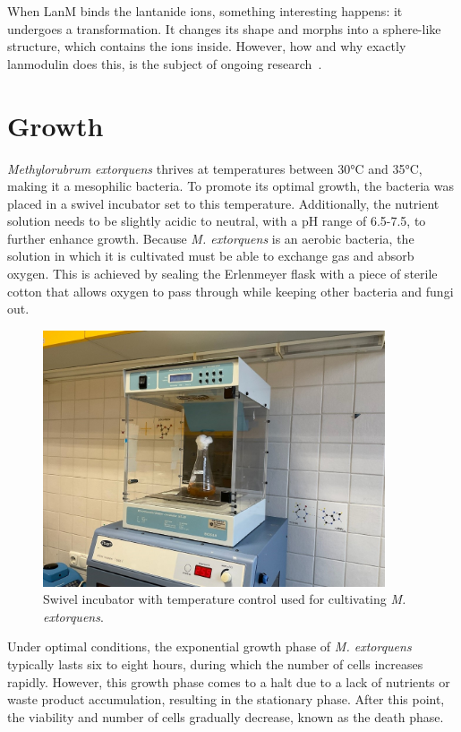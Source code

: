 When LanM binds the lantanide ions, something interesting happens: it undergoes a transformation.
It changes its shape and morphs into a sphere-like structure, which contains the ions inside.
However, how and why exactly lanmodulin does this, is the subject of ongoing research~\cite{lanmongoingresearch}.

\section{Growth\authorB}
\emph{Methylorubrum extorquens} thrives at temperatures between 30°C and 35°C, making it a
mesophilic bacteria.
To promote its optimal growth, the bacteria was placed in a swivel
incubator set to this temperature.
Additionally, the nutrient solution needs to be slightly acidic to neutral, with a pH range of 6.5-7.5, to further enhance growth.
Because \emph{M. extorquens} is an aerobic bacteria, the solution in which it is cultivated must be able to exchange gas and absorb oxygen.
This is achieved by sealing the Erlenmeyer flask with a piece of sterile cotton that allows oxygen to pass through while keeping other bacteria and fungi out.

\begin{figure}[H]
    \centering
    \includegraphics[width=0.9\textwidth]{./media/images/swivel_incubator}
    \caption{Swivel incubator with temperature control used for cultivating \emph{M. extorquens}.}
    \label{fig:swivel_incubator}
\end{figure}

Under optimal conditions, the exponential growth phase of \emph{M. extorquens} typically lasts six to eight hours, during which the number of cells increases rapidly.
However, this growth phase comes to a halt due to a lack of nutrients or waste product accumulation, resulting in the stationary phase.
After this point, the viability and number of cells gradually decrease, known as the death phase.


